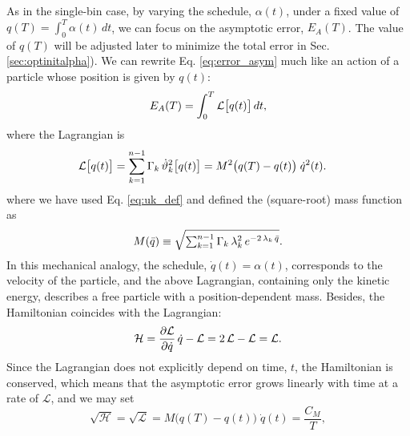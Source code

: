 \documentclass[reprint, superscriptaddress, floatfix]{revtex4-1}
\newcommand{\Err}{E}
\begin{document}
As in the single-bin case,
by varying the schedule, $\alpha(t)$, under a fixed value of
$q(T) = \int_0^T \alpha(t) \, dt$,
we can focus on the asymptotic error,
$\Err_A(T)$.
%
The value of $q(T)$ will be adjusted later
to minimize the total error in Sec. \ref{sec:optinitalpha}).
%
We can rewrite Eq. \eqref{eq:error_asym} much like an action
of a particle whose position is given by $q(t)$:
%
\begin{equation}
  \Err_A(T)
  =
  \int_0^T
    {\mathcal L} \bigl[ q(t)\bigr]
    \, dt
  ,
  \notag
\end{equation}
%
where the Lagrangian is
%
\begin{align}
  {\mathcal L} \bigl[ q(t) \bigr]
  &=
  \sum_{ k = 1 }^{n - 1}
    \Gamma_k \, {\dot \vartheta}_k^2\bigl[ q(t) \bigr]
  =
  M^2\bigl(q(T) - q(t) \bigr)
  \; \dot q^2( t )
  .
\notag
\end{align}
%
where we have
used Eq. \eqref{eq:uk_def} and
defined the (square-root) mass function as
%
\begin{equation}
  M(\bar q)
  \equiv
  \sqrt{
    \textstyle\sum_{ k = 1 }^{n - 1}
    \Gamma_k \, \lambda_k^2 \, e^{-2 \, \lambda_k \, \bar q}
  }
  .
  \notag
\end{equation}
%
In this mechanical analogy,
the schedule, $\dot q(t) = \alpha(t)$,
corresponds to the velocity of the particle,
%
and the above Lagrangian, containing only the kinetic energy,
describes a free particle
with a position-dependent mass.
%
Besides, the Hamiltonian
coincides with the Lagrangian:
%
\begin{equation}
  \mathcal H
  =
  \frac{ \partial \mathcal L }
       { \partial \dot q     }
  \, \dot q
  -
  \mathcal L
  =
  2 \, \mathcal L
  - \mathcal L
  =
  \mathcal L
  .
  \notag
\end{equation}
%
Since the Lagrangian
does not explicitly depend on time, $t$,
the Hamiltonian is conserved,\cite{}
which means that the asymptotic error grows
linearly with time at a rate of $\mathcal L$,
and we may set
%
\begin{equation}
  \sqrt{ \mathcal H }
  =
  \sqrt{ \mathcal L }
  =
  M\bigl( q(T) - q(t) \bigr)
  \;
  \dot q(t)
  =
  \frac{C_M}{T}
  ,
  \label{eq:Lagrangian_const}
\end{equation}
\end{document}
